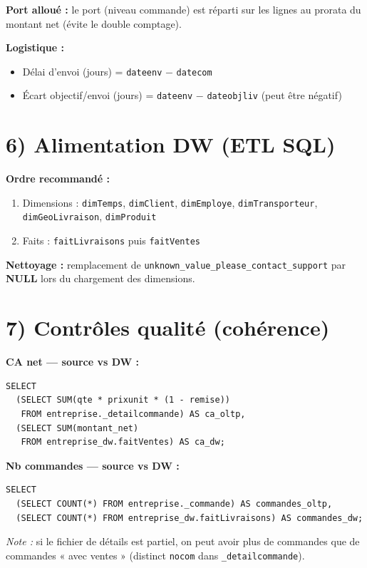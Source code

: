 \documentclass[a4paper,12pt]{article}
\begin{document}
\textbf{Port alloué :} le port (niveau commande) est réparti sur les lignes au prorata du montant net (évite le double comptage).

\textbf{Logistique :}
\begin{itemize}
  \item Délai d’envoi (jours) = \texttt{dateenv} $-$ \texttt{datecom}
  \item Écart objectif/envoi (jours) = \texttt{dateenv} $-$ \texttt{dateobjliv} (peut être négatif)
\end{itemize}

\section*{6) Alimentation DW (ETL SQL)}
\textbf{Ordre recommandé :}
\begin{enumerate}
  \item Dimensions : \texttt{dimTemps}, \texttt{dimClient}, \texttt{dimEmploye}, \texttt{dimTransporteur}, \texttt{dimGeoLivraison}, \texttt{dimProduit}
  \item Faits : \texttt{faitLivraisons} puis \texttt{faitVentes}
\end{enumerate}

\textbf{Nettoyage :} remplacement de \texttt{unknown\_value\_please\_contact\_support} par \textbf{NULL} lors du chargement des dimensions.

\section*{7) Contrôles qualité (cohérence)}
\textbf{CA net — source vs DW :}
\begin{verbatim}
SELECT
  (SELECT SUM(qte * prixunit * (1 - remise))
   FROM entreprise._detailcommande) AS ca_oltp,
  (SELECT SUM(montant_net)
   FROM entreprise_dw.faitVentes) AS ca_dw;
\end{verbatim}

\textbf{Nb commandes — source vs DW :}
\begin{verbatim}
SELECT
  (SELECT COUNT(*) FROM entreprise._commande) AS commandes_oltp,
  (SELECT COUNT(*) FROM entreprise_dw.faitLivraisons) AS commandes_dw;
\end{verbatim}

\textit{Note :} si le fichier de détails est partiel, on peut avoir plus de commandes que de commandes « avec ventes » (distinct \texttt{nocom} dans \texttt{\_detailcommande}).
\end{document}
